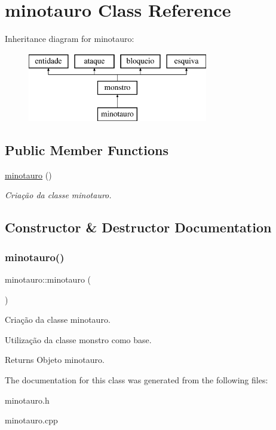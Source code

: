 \hypertarget{classminotauro}{}\section{minotauro Class Reference}
\label{classminotauro}
Inheritance diagram for minotauro\+:\begin{figure}[H]
\begin{center}
\leavevmode
\includegraphics[height=3.000000cm]{classminotauro}
\end{center}
\end{figure}
\subsection*{Public Member Functions}
\begin{DoxyCompactItemize}
\item 
\mbox{\hyperlink{classminotauro_ae0c61c79540cae3c5afded22d870a449}{minotauro}} ()
\begin{DoxyCompactList}\small\item\em Criação da classe minotauro. \end{DoxyCompactList}\end{DoxyCompactItemize}


\subsection{Constructor \& Destructor Documentation}
\mbox{\label{classminotauro_ae0c61c79540cae3c5afded22d870a449}} 
\subsubsection{\texorpdfstring{minotauro()}{minotauro()}}
{\footnotesize\ttfamily minotauro\+::minotauro (\begin{DoxyParamCaption}{ }\end{DoxyParamCaption})}



Criação da classe minotauro. 

Utilização da classe monstro como base. \begin{DoxyReturn}{Returns}
Objeto minotauro. 
\end{DoxyReturn}


The documentation for this class was generated from the following files\+:\begin{DoxyCompactItemize}
\item 
minotauro.\+h\item 
minotauro.\+cpp\end{DoxyCompactItemize}
